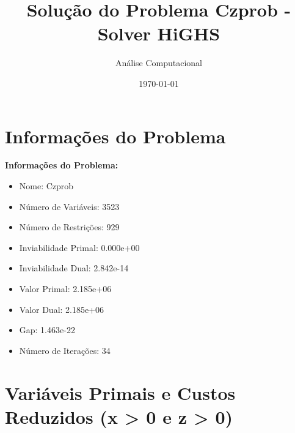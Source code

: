 \documentclass[12pt]{article}
\title{Solução do Problema Czprob - Solver HiGHS}
\author{Análise Computacional}
\date{\today}
\begin{document}
\maketitle

\section{Informações do Problema}

\textbf{Informações do Problema:}
\begin{itemize}
\item Nome: Czprob
\item Número de Variáveis: 3523
\item Número de Restrições: 929
\item Inviabilidade Primal: 0.000e+00
\item Inviabilidade Dual: 2.842e-14
\item Valor Primal: 2.185e+06
\item Valor Dual: 2.185e+06
\item Gap: 1.463e-22
\item Número de Iterações: 34
\end{itemize}


\section{Variáveis Primais e Custos Reduzidos (x > 0 e z > 0)}
\end{document}

